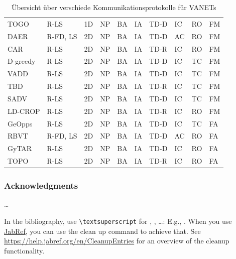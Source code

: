 \documentclass[english,runningheads,a4paper]{llncs}[2018/03/10]
\begin{document}
{\begin{table}[]
{\begin{tabular}{llllllllll}
    TOGO                          & R-LS     & 1D & NP    & BA & IA     & TD-D     & IC    & RO & FM \\
    DAER                          & R-FD, LS & 2D & NP    & BA & IA     & TD-D     & AC    & RO & FM \\
    CAR                           & R-LS     & 2D & NP    & BA & IA     & TD-R     & IC    & RO & FM \\
    D-greedy                      & R-LS     & 2D & NP    & BA & IA     & TD-D     & IC    & TC & FM \\
    VADD                          & R-LS     & 2D & NP    & BA & IA     & TD-D     & IC    & TC & FM \\
    TBD                           & R-LS     & 2D & NP    & BA & IA     & TD-R     & IC    & TC & FM \\
    SADV                          & R-LS     & 2D & NP    & BA & IA     & TD-D     & IC    & TC & FM \\
    LD-CROP                       & R-LS     & 2D & NP    & BA & IA     & TD-R     & IC    & RO & FM \\
    GeOpps                        & R-LS     & 2D & NP    & BA & IA     & TD-D     & IC    & TC & FA \\
    RBVT                          & R-FD, LS & 2D & NP    & BA & IA     & TD-D     & AC    & RO & FA \\
    GyTAR                         & R-LS     & 2D & NP    & BA & IA     & TD-D     & IC    & RO & FA \\
    TOPO                          & R-LS     & 2D & NP    & BA & IA     & TD-R     & IC    & RO & FA
  \end{tabular}
  \caption{Übersicht über verschiede Kommunikationsprotokolle für VANETs\cite{conti2013mobile}}
  \label{table:1}
}
\end{table}

\subsubsection*{Acknowledgments}
\ldots

In the bibliography, use \texttt{\textbackslash textsuperscript} for , , \ldots:
E.g., .
When you use \href{https://www.jabref.org}{JabRef}, you can use the clean up command to achieve that.
See \url{https://help.jabref.org/en/CleanupEntries} for an overview of the cleanup functionality.

}
\end{document}
